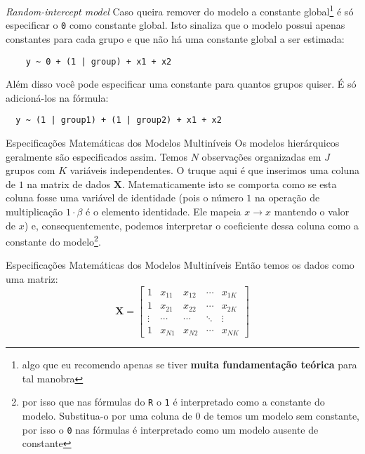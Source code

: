 \begin{frame}[fragile]{\textit{Random-intercept model}}
  Caso queira remover do modelo a constante global\footnote{algo que eu recomendo
  apenas se tiver \textbf{muita fundamentação teórica} para tal manobra}
  é só especificar o \texttt{0} como constante global. Isto sinaliza que o modelo
  possui apenas constantes para cada grupo e que não há uma constante global a
  ser estimada:
  \begin{lstlisting}
    y ~ 0 + (1 | group) + x1 + x2
  \end{lstlisting}
  \vfill
  Além disso você pode especificar uma constante para quantos grupos quiser.
  É só adicioná-los na fórmula:
  \begin{lstlisting}
  y ~ (1 | group1) + (1 | group2) + x1 + x2
  \end{lstlisting}
\end{frame}

\begin{frame}{Especificações Matemáticas dos Modelos Multiníveis}
  Os modelos hierárquicos geralmente são especificados assim.
  \vfill
  Temos $N$ observações organizadas em $J$ grupos com $K$ variáveis independentes.
  \vfill
  O truque aqui é que inserimos uma coluna de $1$ na matrix de dados $\mathbf{X}$.
  Matematicamente isto se comporta como se esta coluna fosse uma variável de identidade
  (pois o número $1$ na operação de multiplicação $1 \cdot \beta$ é o elemento identidade.
  Ele mapeia $x \to x$ mantendo o valor de $x$) e, consequentemente, podemos interpretar o
  coeficiente dessa coluna como a constante do modelo\footnote{por isso que nas fórmulas do
  \texttt{R} o \texttt{1} é interpretado como a constante do modelo. Substitua-o por uma coluna
  de $0$ de temos um modelo sem constante, por isso o \texttt{0} nas fórmulas é interpretado
  como um modelo ausente de constante}.
\end{frame}

\begin{frame}{Especificações Matemáticas dos Modelos Multiníveis}
  Então temos os dados como uma matriz:
  $$
  \mathbf{X} =
  \begin{bmatrix}
  1 & x_{11} & x_{12} & \cdots & x_{1K} \\
  1 & x_{21} & x_{22} & \cdots & x_{2K} \\
  \vdots & \cdots & \cdots & \ddots & \vdots \\
  1 & x_{N1} & x_{N2} & \cdots & x_{NK}
  \end{bmatrix}
  $$
\end{frame}

